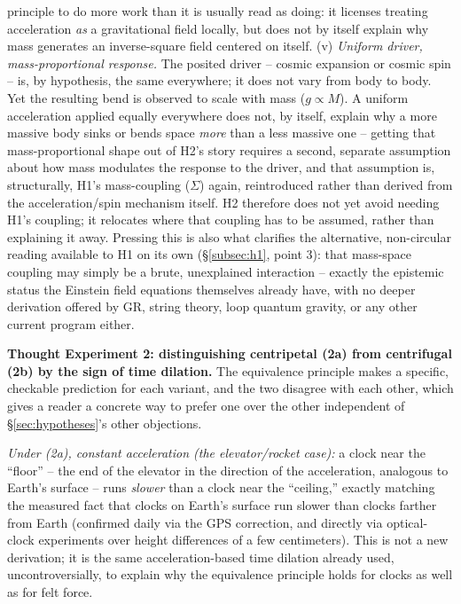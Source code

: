 \documentclass[12pt, a4paper]{article}
\begin{document}
principle to do more work than it is usually read as doing: it
licenses treating acceleration \emph{as} a gravitational field
locally, but does not by itself explain why mass generates an
inverse-square field centered on itself. (v) \emph{Uniform driver,
mass-proportional response.} The posited driver -- cosmic expansion
or cosmic spin -- is, by hypothesis, the same everywhere; it does not
vary from body to body. Yet the resulting bend is observed to scale
with mass ($g\propto M$). A uniform acceleration applied equally
everywhere does not, by itself, explain why a more massive body sinks
or bends space \emph{more} than a less massive one -- getting that
mass-proportional shape out of H2's story requires a second,
separate assumption about how mass modulates the response to the
driver, and that assumption is, structurally, H1's mass-coupling
($\Sigma$) again, reintroduced rather than derived from the
acceleration/spin mechanism itself. H2 therefore does not yet avoid
needing H1's coupling; it relocates where that coupling has to be
assumed, rather than explaining it away. Pressing this is also what
clarifies the alternative, non-circular reading available to H1 on
its own (\S\ref{subsec:h1}, point 3): that mass-space coupling may
simply be a brute, unexplained interaction -- exactly the epistemic
status the Einstein field equations themselves already have, with no
deeper derivation offered by GR, string theory, loop quantum gravity,
or any other current program either.

\textbf{Thought Experiment 2: distinguishing centripetal (2a) from
centrifugal (2b) by the sign of time dilation.} The equivalence principle makes a specific,
checkable prediction for each variant, and the two disagree with each
other, which gives a reader a concrete way to prefer one over the
other independent of \S\ref{sec:hypotheses}'s other objections.

\emph{Under (2a), constant acceleration (the elevator/rocket case):}
a clock near the ``floor'' -- the end of the elevator in the direction
of the acceleration, analogous to Earth's surface -- runs
\emph{slower} than a clock near the ``ceiling,'' exactly matching the
measured fact that clocks on Earth's surface run slower than clocks
farther from Earth (confirmed daily via the GPS correction, and
directly via optical-clock experiments over height differences of a
few centimeters). This is not a new derivation; it is the same
acceleration-based time dilation already used, uncontroversially, to
explain why the equivalence principle holds for clocks as well as for
felt force.
\end{document}

